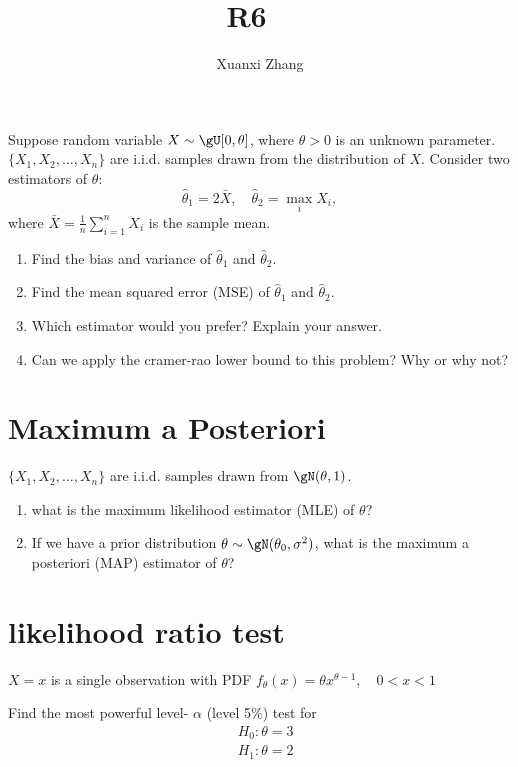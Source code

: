 \documentclass{article}%
\title{\huge R6 \ \normalsize}
\author{Xuanxi Zhang}
\newif\ifwithrefs
\begin{document}
\maketitle
\section{}
Suppose random variable  $X\sim \gU[0,\theta]$, where $\theta>0$ is an unknown parameter. $\{X_1,X_2,\ldots,X_n\}$ are i.i.d. samples drawn from the distribution of $X$. Consider two estimators of $\theta$:
\[\hat{\theta}_1=2\bar{X},\quad \hat{\theta}_2=\max_i X_{i},\]
where $\bar{X}=\frac{1}{n}\sum_{i=1}^n X_i$ is the sample mean.

\begin{enumerate}
    \item Find the bias and variance of $\hat{\theta}_1$ and $\hat{\theta}_2$.
    \item Find the mean squared error (MSE) of $\hat{\theta}_1$ and $\hat{\theta}_2$.
    \item Which estimator would you prefer? Explain your answer.
    \item Can we apply the cramer-rao lower bound to this problem? Why or why not?
\end{enumerate}

\section{Maximum a Posteriori}
$\{X_1,X_2,\ldots,X_n\}$ are i.i.d. samples drawn from $\gN(\theta,1)$.
\begin{enumerate}
    \item what is the maximum likelihood estimator (MLE) of $\theta$?
    \item If we have a prior distribution $\theta\sim \gN(\theta_0,\sigma^2)$, what is the maximum a posteriori (MAP) estimator of $\theta$?
\end{enumerate}

\section{likelihood ratio test}
$X=x$ is a single observation with PDF $f_\theta(x)=\theta x^{\theta-1}, \quad 0<x<1$

Find the most powerful level- $\alpha$ (level 5\%) test for
$$
\begin{aligned}
& H_0: \theta=3 \\
& H_1: \theta=2
\end{aligned}
$$


\ifwithrefs
  
\fi
\end{document}
